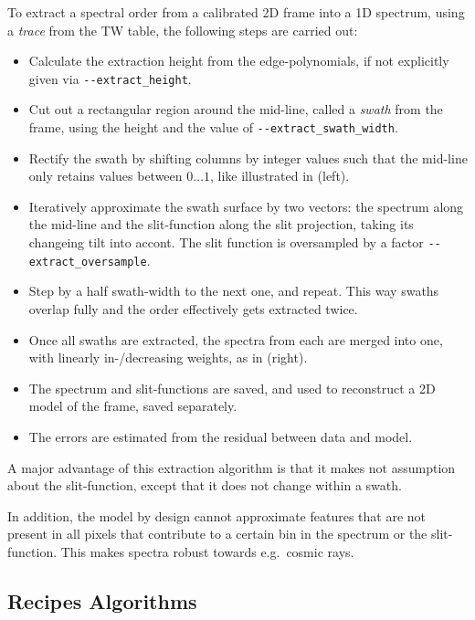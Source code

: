 To extract a spectral order from a calibrated 2D frame into a 1D spectrum, using
a \emph{trace} from the TW table, the following steps are carried out:
\begin{itemize}
    \item Calculate the extraction height from the edge-polynomials, if not
    explicitly given via \texttt{-{}-extract\_height}.
    \item Cut out a rectangular region around the mid-line, called a
    \emph{swath} from the frame, using the height and the value of
    \texttt{-{}-extract\_swath\_width}.
    \item Rectify the swath by shifting columns by integer values such that the
    mid-line only retains values between $0\ldots 1$, like illustrated in
     (left).
    \item Iteratively approximate the swath surface by two vectors: the spectrum
    along the mid-line and the slit-function along the slit projection, taking
    its changeing tilt into accont. The slit function is oversampled by a factor
    \texttt{-{}-extract\_oversample}.
    \item Step by a half swath-width to the next one, and repeat. This way
    swaths overlap fully and the order effectively gets extracted twice.
    \item Once all swaths are extracted, the spectra from each are merged into
    one, with linearly in-/decreasing weights, as in 
    (right).
    \item The spectrum and slit-functions are saved, and used to reconstruct a 2D model of the frame, saved separately.
    \item The errors are estimated from the residual between data and model.
\end{itemize}

A major advantage of this extraction algorithm is that it makes not assumption about the slit-function, except that it does not change within a swath.

In addition, the model by design cannot approximate features that are not present in all pixels that contribute to a certain bin in the spectrum or the slit-function. This makes spectra robust towards e.g.~cosmic rays.

\subsection{Recipes Algorithms} 
\label{sec:algorithms-recipes}


